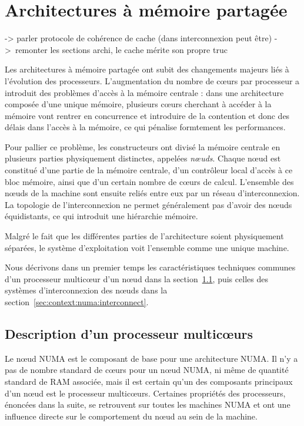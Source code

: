 \section{Architectures à mémoire partagée}\label{sec:context:numa}

\begin{todo}

  -> parler protocole de cohérence de cache (dans interconnexion peut être)
  -> remonter les sections archi, le cache mérite son propre truc

\end{todo}


Les architectures à mémoire partagée ont subit des changements majeurs liés à l'évolution des processeurs.
L'augmentation du nombre de cœurs par processeur a introduit des problèmes d'accès à la mémoire centrale : dans une architecture composée d'une unique mémoire, plusieurs cœurs cherchant à accéder à la mémoire vont rentrer en concurrence et introduire de la contention et donc des délais dans l'accès à la mémoire, ce qui pénalise formtement les performances.

Pour pallier ce problème, les constructeurs ont divisé la mémoire centrale en plusieurs parties physiquement distinctes, appelées \emph{nœuds}.
Chaque nœud est constitué d'une partie de la mémoire centrale, d'un contrôleur local d'accès à ce bloc mémoire, ainsi que d'un certain nombre de cœurs de calcul.
L'ensemble des nœuds de la machine sont ensuite reliés entre eux par un réseau d'interconnexion.
La topologie de l'interconnexion ne permet généralement pas d'avoir des nœuds équidistants, ce qui introduit une hiérarchie mémoire.

Malgré le fait que les différentes parties de l'architecture soient physiquement séparées, le système d'exploitation voit l'ensemble comme une unique machine.

Nous décrivons dans un premier temps les caractéristiques techniques communes d'un processeur multicœur d'un nœud dans la section~\ref{sec:context:numa:node}, puis celles des systèmes d'interconnexion des nœuds dans la section~\ref{sec:context:numa:interconnect}.

\subsection{Description d'un processeur multicœurs}\label{sec:context:numa:node}

Le nœud NUMA est le composant de base pour une architecture NUMA.
Il n'y a pas de nombre standard de cœurs pour un nœud NUMA, ni même de quantité standard de RAM associée, mais il est certain qu'un des composants principaux d'un nœud est le processeur multicœurs.
Certaines propriétés des processeurs, énoncées dans la suite, se retrouvent sur toutes les machines NUMA et ont une influence directe sur le comportement du nœud au sein de la machine.

